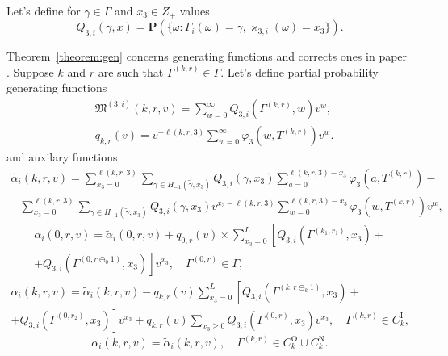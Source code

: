 \documentclass[runningheads,a4paper]{llncs}
\begin{document}
Let's define for $\gamma \in \Gamma$ and $x_3 \in Z_+$ values
\begin{equation*}
Q_{3,i}(\gamma,x) = {\mathbf P}(\{\omega\colon \Gamma_{i}(\omega)=\gamma, \varkappa_{3,i}(\omega)=x_3\}).
\end{equation*}

Theorem~\ref{theorem:gen} concerns generating functions and corrects ones in paper \cite{k:z:2016}. Suppose $k$ and $r$ are such that $\Gamma^{(k,r)}\in \Gamma$. Let's define  partial probability generating functions 
\begin{align*}
&\mathfrak{M}^{(3,i)}(k,r,v) = \sum_{w=0}^{\infty} Q_{3,i}(\Gamma^{(k,r)},w) v^w,\\
&q_{k,r}(v) = v^{-\ell(k,r,3)}\sum_{w=0}^{\infty} \varphi_3(w,T^{(k,r)})v^w.
\end{align*}
and auxilary functions
\begin{multline*}
\tilde{\alpha}_i(k,r,v) = \sum_{x_3=0}^{\ell(k,r,3)}\sum_{\gamma \in H_{-1}(\tilde{\gamma},x_3)} Q_{3,i}(\gamma,x_3) \sum_{a=0}^{\ell(k,r,3) - x_3} \varphi_3(a,T^{(k,r)}) - \\
- \sum_{x_3=0}^{\ell(k,r,3)}  \sum_{\gamma \in H_{-1}(\tilde{\gamma},x_3)} Q_{3,i}(\gamma,x_3) v^{x_3-\ell(k,r,3)}  \sum_{w=0}^{\ell(k,r,3) -x_3}
\varphi_3(w,T^{(k,r)}) v^w,
\end{multline*}
\begin{multline*}
\alpha_i(0,r,v) =\tilde{\alpha}_i(0,r,v) + q_{0,r}(v) \times \sum_{x_3=0}^{L} \left[ Q_{3,i}(\Gamma^{(k_1,r_1)},x_3) +\right. \\
\left. + Q_{3,i}(\Gamma^{(0,r\ominus_0 1)},x_3) \right] v^{x_3}, \quad \Gamma^{(0,r)} \in \Gamma,
\end{multline*}
\begin{multline*}
\alpha_i(k,r,v) =\tilde{\alpha}_i(k,r,v) - q_{k,r}(v)\sum_{x_3=0}^{L} \left[ Q_{3,i}(\Gamma^{(k,r\ominus_{k} 1)},x_3) \right. + \\ +\left.  Q_{3,i}(\Gamma^{(0,r_2)},x_3) \right] v^{x_3}
+ q_{k,r}(v)\sum_{x_3 \geqslant 0} Q_{3,i}(\Gamma^{(0,r)},x_3)v^{x_3}, \quad \Gamma^{(k, r)} \in C_{k}^{\mathrm{I}},
\end{multline*}
\begin{equation*}
\alpha_i(k,r,v) =\tilde{\alpha}_i(k,r,v), \quad \Gamma^{(k, r)} \in C_{k}^{\mathrm{O}} \cup C_{k}^{\mathrm{N}}.
\end{equation*}
\end{document}
